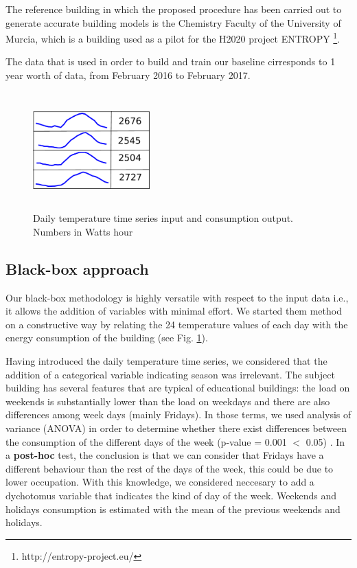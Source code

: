 \documentclass[10pt, conference, compsocconf]{IEEEtran}
\begin{document}
The reference building in which the proposed procedure has been carried out to generate accurate building models is the Chemistry Faculty of the University of Murcia, which is a building used as a pilot for the H2020 project ENTROPY \footnote{http://entropy-project.eu/}.  

The data that is used in order to build and train our baseline cirresponds to 1 year worth of data, from February 2016 to February 2017. 

\begin{figure}[h]%
\centering
\centerline{\includegraphics[width=4.5cm,height=4.5cm,keepaspectratio]{./pics/table_inputs_outputs.pdf}}
\caption{Daily temperature time series input and consumption output. Numbers in Watts hour}\vspace*{-6pt}
  \label{fig:inout}
\end{figure}

\subsection{Black-box approach}

Our black-box methodology is highly versatile with respect to the input data i.e.,  it allows the addition of variables with minimal effort. We started them method on a constructive way by relating the 24 temperature values of each day with the energy consumption of the building (see Fig. \ref{fig:inout}).

Having introduced the daily temperature time series, we considered that the addition of a categorical variable indicating season was irrelevant. The subject building has several features that are typical of educational buildings: the load %
on weekends is substantially lower than the load on weekdays and there are also differences among week days (mainly Fridays).
In those terms, we used analysis of variance (ANOVA) in order to determine whether there exist differences between the consumption of the different days of the week (p-value = 0.001 $<$ 0.05) . 	In a \textbf{post-hoc}  test, the conclusion is that we can consider that Fridays have a different behaviour than the rest of the days of the week, this could be due to lower occupation. With this knowledge, we considered neccesary to add a dychotomus variable that indicates the kind of day of the week. Weekends and holidays consumption is estimated with the mean of the previous weekends and holidays.
\end{document}
